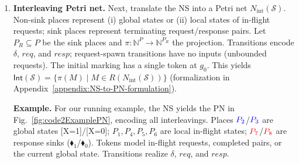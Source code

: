 \begin{enumerate}
	
%		
%			
%			
%		
	
	
	
	\item 
	\textbf{Interleaving Petri net.}
%	
Next, translate the NS into a Petri net $N_{\mathrm{int}}(\mathcal S)$. Non-sink places represent (i) global states or (ii) local states of in-flight requests; sink places represent terminating request/response pairs. Let $P_R\subseteq P$ be the sink places and $\pi\colon\mathbb N^{P}\to\mathbb N^{P_R}$ the projection. Transitions encode $\delta$, $req$, and $resp$; request-spawn transitions have no inputs (unbounded requests). The initial marking has a single token at $g_0$. This yields $\mathsf{Int}(\mathcal S)=\{\pi(M)\mid M\in R(N_{\mathrm{int}}(\mathcal S))\}$ (formalization in Appendix~\ref{appendix:NS-to-PN-formulation}).



\begin{tcolorbox}[colback=black!5!white, colframe=black, boxrule=1pt]
\textbf{Example.}
For our running example, the NS yields the PN in Fig.~\ref{fig:code2ExamplePN}, encoding all interleavings. Places $\textcolor{blue}{P_2}$/$\textcolor{blue}{P_3}$ are global states [X=1]/[X=0]; $P_1,P_4,P_5,P_6$ are local in-flight states; $\textcolor{red}{P_7}$/$\textcolor{red}{P_8}$ are response sinks ($\blacklozenge_1$/$\blacklozenge_0$). Tokens model in-flight requests, completed pairs, or the current global state. Transitions realize $\delta$, $req$, and $resp$.
\end{tcolorbox}


\end{enumerate}
